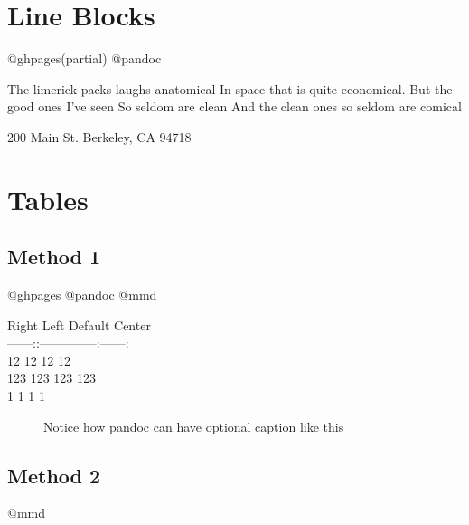 \section{Line Blocks}
\label{lineblocks}

@ghpages(partial) @pandoc

\textbar{} The limerick packs laughs anatomical
\textbar{} In space that is quite economical.
\textbar{} But the good ones I've seen
\textbar{} So seldom are clean
\textbar{} And the clean ones so seldom are comical

\textbar{} 200 Main St.
\textbar{} Berkeley, CA 94718

\section{Tables}
\label{tables}

\subsection{Method 1}
\label{method1}

@ghpages @pandoc @mmd

\begin{description}

\item[\textbar{} Right \textbar{} Left \textbar{} Default \textbar{} Center \textbar{}]

\item[\textbar{}------:\textbar{}:-----\textbar{}---------\textbar{}:------:\textbar{}]

\item[\textbar{} 12 \textbar{} 12 \textbar{} 12 \textbar{} 12 \textbar{}]

\item[\textbar{} 123 \textbar{} 123 \textbar{} 123 \textbar{} 123 \textbar{}]

\item[\textbar{} 1 \textbar{} 1 \textbar{} 1 \textbar{} 1 \textbar{}]

Notice how pandoc can have optional caption like this
\end{description}

\subsection{Method 2}
\label{method2}

@mmd

